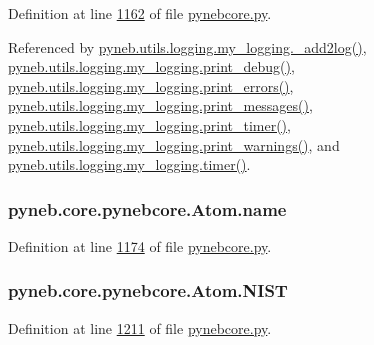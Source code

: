 Definition at line \hyperlink{pynebcore_8py_source_l01162}{1162} of file \hyperlink{pynebcore_8py_source}{pynebcore.\+py}.



Referenced by \hyperlink{logging_8py_source_l00059}{pyneb.\+utils.\+logging.\+my\+\_\+logging.\+\_\+add2log()}, \hyperlink{logging_8py_source_l00157}{pyneb.\+utils.\+logging.\+my\+\_\+logging.\+print\+\_\+debug()}, \hyperlink{logging_8py_source_l00149}{pyneb.\+utils.\+logging.\+my\+\_\+logging.\+print\+\_\+errors()}, \hyperlink{logging_8py_source_l00133}{pyneb.\+utils.\+logging.\+my\+\_\+logging.\+print\+\_\+messages()}, \hyperlink{logging_8py_source_l00165}{pyneb.\+utils.\+logging.\+my\+\_\+logging.\+print\+\_\+timer()}, \hyperlink{logging_8py_source_l00141}{pyneb.\+utils.\+logging.\+my\+\_\+logging.\+print\+\_\+warnings()}, and \hyperlink{logging_8py_source_l00115}{pyneb.\+utils.\+logging.\+my\+\_\+logging.\+timer()}.

\hypertarget{classpyneb_1_1core_1_1pynebcore_1_1_atom_aa8b43e1441b80824954f2f2fac4f2eba}{}
\subsubsection[{name}]{\setlength{\rightskip}{0pt plus 5cm}pyneb.\+core.\+pynebcore.\+Atom.\+name}\label{classpyneb_1_1core_1_1pynebcore_1_1_atom_aa8b43e1441b80824954f2f2fac4f2eba}


Definition at line \hyperlink{pynebcore_8py_source_l01174}{1174} of file \hyperlink{pynebcore_8py_source}{pynebcore.\+py}.

\hypertarget{classpyneb_1_1core_1_1pynebcore_1_1_atom_a65e03e79fb1cde1b00580042f3303538}{}
\subsubsection[{N\+I\+S\+T}]{\setlength{\rightskip}{0pt plus 5cm}pyneb.\+core.\+pynebcore.\+Atom.\+N\+I\+S\+T}\label{classpyneb_1_1core_1_1pynebcore_1_1_atom_a65e03e79fb1cde1b00580042f3303538}


Definition at line \hyperlink{pynebcore_8py_source_l01211}{1211} of file \hyperlink{pynebcore_8py_source}{pynebcore.\+py}.



